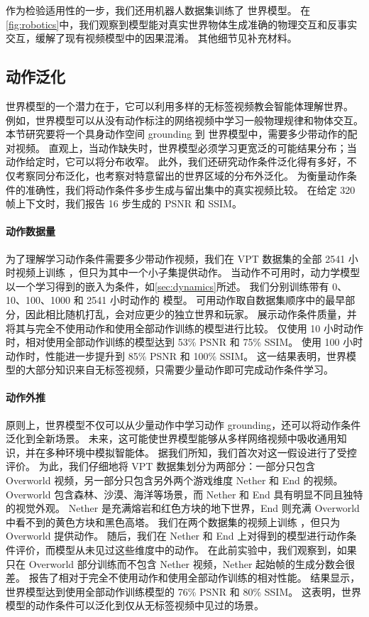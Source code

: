 \documentclass[11pt]{article}
\begin{document}
作为检验适用性的一步，我们还用机器人数据集训练了 \method 世界模型\citep{soar}。
在\cref{fig:robotics}中，我们观察到模型能对真实世界物体生成准确的物理交互和反事实交互，缓解了现有视频模型中的因果混淆。
其他细节见补充材料。

\subsection{动作泛化}
\label{sec:actgen}

世界模型的一个潜力在于，它可以利用多样的无标签视频教会智能体理解世界。
例如，世界模型可以从没有动作标注的网络视频中学习一般物理规律和物体交互。
本节研究要将一个具身动作空间 grounding 到 \method 世界模型中，需要多少带动作的配对视频。
直观上，当动作缺失时，世界模型必须学习更宽泛的可能结果分布；当动作给定时，它可以将分布收窄。
此外，我们还研究动作条件泛化得有多好，不仅考察同分布泛化，也考察对特意留出的世界区域的分布外泛化。
为衡量动作条件的准确性，我们将动作条件多步生成与留出集中的真实视频比较。
在给定 320 帧上下文时，我们报告 16 步生成的 PSNR 和 SSIM。



\paragraph{动作数据量}
为了理解学习动作条件需要多少带动作视频，我们在 VPT 数据集的全部 2541 小时视频上训练 \method，但只为其中一个小子集提供动作。
当动作不可用时，动力学模型以一个学习得到的嵌入为条件，如\cref{sec:dynamics}所述。
我们分别训练带有 0、10、100、1000 和 2541 小时动作的 \method 模型。
可用动作取自数据集顺序中的最早部分，因此相比随机打乱，会对应更少的独立世界和玩家。
 展示动作条件质量，并将其与完全不使用动作和使用全部动作训练的模型进行比较。
仅使用 10 小时动作时，\method 相对使用全部动作训练的模型达到 53\% PSNR 和 75\% SSIM。
使用 100 小时动作时，性能进一步提升到 85\% PSNR 和 100\% SSIM。
这一结果表明，世界模型的大部分知识来自无标签视频，只需要少量动作即可完成动作条件学习。

\paragraph{动作外推}

原则上，世界模型不仅可以从少量动作中学习动作 grounding，还可以将动作条件泛化到全新场景。
未来，这可能使世界模型能够从多样网络视频中吸收通用知识，并在多种环境中模拟智能体。
据我们所知，我们首次对这一假设进行了受控评价。
为此，我们仔细地将 VPT 数据集划分为两部分：一部分只包含 Overworld 视频，另一部分只包含另外两个游戏维度 Nether 和 End 的视频。
Overworld 包含森林、沙漠、海洋等场景，而 Nether 和 End 具有明显不同且独特的视觉外观。
Nether 是充满熔岩和红色方块的地下世界，End 则充满 Overworld 中看不到的黄色方块和黑色高塔。
我们在两个数据集的视频上训练 \method，但只为 Overworld 提供动作。
随后，我们在 Nether 和 End 上对得到的模型进行动作条件评价，而模型从未见过这些维度中的动作。
在此前实验中，我们观察到，如果只在 Overworld 部分训练而不包含 Nether 视频，Nether 起始帧的生成分数会很差。
 报告了相对于完全不使用动作和使用全部动作训练的相对性能。
结果显示，世界模型达到使用全部动作训练模型的 76\% PSNR 和 80\% SSIM。
这表明，世界模型的动作条件可以泛化到仅从无标签视频中见过的场景。
\end{document}
